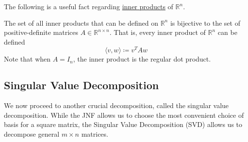   The following is a useful fact regarding \hyperref[def:inner-product]{inner products} of $\mathbb{R}^n$. 

	\begin{theorem}
	  \label{thm:inner-products-on-rn-as-positive-definite}
		The set of all inner products that can be defined on $\mathbb{R}^n$ is bijective to the set of positive-definite matrices $A \in \mathbb{R}^{n \times n}$. That is, every inner product of $\mathbb{R}^n$ can be defined 
    \begin{equation}
      \langle v, w \rangle \coloneqq v^T A w
    \end{equation}
    Note that when $A = I_n$, the inner product is the regular dot product.
  \end{theorem}

\subsection{Singular Value Decomposition} 

  We now proceed to another crucial decomposition, called the singular value decomposition. While the JNF allows us to choose the most convenient choice of basis for a square matrix, the Singular Value Decomposition (SVD) allows us to decompose general $m \times n$ matrices. 

